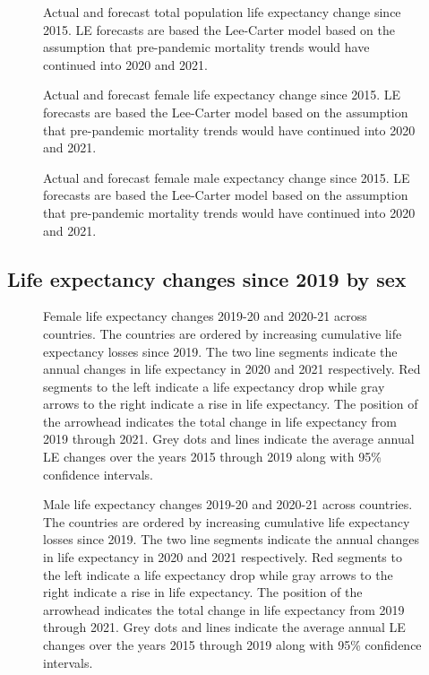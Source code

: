 \documentclass[12pt]{article}
\begin{document}
\begin{figure}[ht!]
    \centering
    \caption{Actual and forecast total population life expectancy change since 2015. LE forecasts are based the Lee-Carter model based on the assumption that pre-pandemic mortality trends would have continued into 2020 and 2021.}
    \label{fig:figure-a1}
\end{figure}

\begin{figure}[ht!]
    \centering
    \caption{Actual and forecast female life expectancy change since 2015. LE forecasts are based the Lee-Carter model based on the assumption that pre-pandemic mortality trends would have continued into 2020 and 2021.}
    \label{fig:figure-a2}
\end{figure}

\begin{figure}[ht!]
    \centering
    \caption{Actual and forecast female male expectancy change since 2015. LE forecasts are based the Lee-Carter model based on the assumption that pre-pandemic mortality trends would have continued into 2020 and 2021.}
    \label{fig:figure-a3}
\end{figure}

\clearpage

\subsection*{Life expectancy changes since 2019 by sex}

\begin{figure}[hb!]
    \centering
    \caption{Female life expectancy changes 2019-20 and 2020-21 across countries. The countries are ordered by increasing cumulative life expectancy losses since 2019. The two line segments indicate the annual changes in life expectancy in 2020 and 2021 respectively. Red segments to the left indicate a life expectancy drop while gray arrows to the right indicate a rise in life expectancy. The position of the arrowhead indicates the total change in life expectancy from 2019 through 2021.
    Grey dots and lines indicate the average annual LE changes over the years 2015 through 2019 along with 95\% confidence intervals.}
    \label{fig:figure-a4}
\end{figure}

\begin{figure}[hb!]
    \centering
    \caption{Male life expectancy changes 2019-20 and 2020-21 across countries. The countries are ordered by increasing cumulative life expectancy losses since 2019.  The two line segments indicate the annual changes in life expectancy in 2020 and 2021 respectively. Red segments to the left indicate a life expectancy drop while gray arrows to the right indicate a rise in life expectancy. The position of the arrowhead indicates the total change in life expectancy from 2019 through 2021.
    Grey dots and lines indicate the average annual LE changes over the years 2015 through 2019 along with 95\% confidence intervals.}
    \label{fig:figure-a5}
\end{figure}
\end{document}
